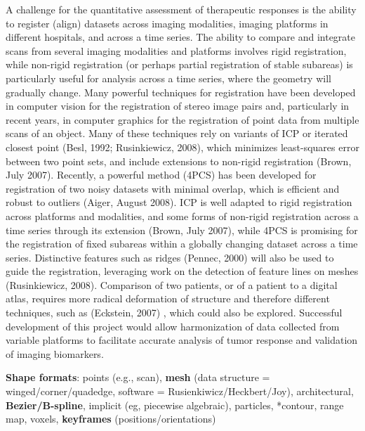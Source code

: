 \documentclass[10pt]{article}
\begin{document}
A challenge for the quantitative assessment of therapeutic responses is the ability 
to register (align) datasets across imaging modalities, imaging platforms in different 
hospitals, and across a time series. 
The ability to compare and integrate scans from several imaging modalities and platforms 
involves rigid registration, 
while non-rigid registration (or perhaps partial registration of stable subareas) 
is particularly useful for analysis across a time series, 
where the geometry will gradually change. 
Many powerful techniques for registration have been developed in computer vision 
for the registration of stereo image pairs and, particularly in recent years, in 
computer graphics for the registration of point data from multiple scans of an object. 
Many of these techniques rely on variants of ICP or iterated closest 
point (Besl, 1992; Rusinkiewicz, 2008), which minimizes least-squares error between 
two point sets, and include extensions to non-rigid registration (Brown, July 2007). 
Recently, a powerful method (4PCS) has been developed for registration of two 
noisy datasets with minimal overlap, which is efficient and robust to 
outliers (Aiger, August 2008). 
ICP is well adapted to rigid registration across platforms and modalities, and 
some forms of non-rigid registration across a time series 
through its extension (Brown, July 2007),
while 4PCS is promising for the registration of fixed subareas 
within a globally changing dataset across a time series. 
Distinctive features such as ridges (Pennec, 2000) will also be used to guide the registration,
leveraging work on the detection of feature lines on meshes (Rusinkiewicz, 2008).
Comparison of two patients, or of a patient to a digital atlas, 
requires more radical deformation of structure and therefore different techniques, 
such as (Eckstein, 2007) , which could also be explored.
Successful development of this project would allow harmonization 
of data collected from variable platforms to facilitate accurate analysis 
of tumor response and validation of imaging biomarkers.

\clearpage

{\bf Shape formats}: points (e.g., scan), 
               {\bf mesh} (data structure = winged/corner/quadedge, 
                     software = Rusienkiwicz/Heckbert/Joy), 
               architectural, 
               {\bf Bezier/B-spline}, 
               implicit (eg, piecewise algebraic), particles,
               *contour, range map, voxels, 
               {\bf keyframes} (positions/orientations)
\end{document}
